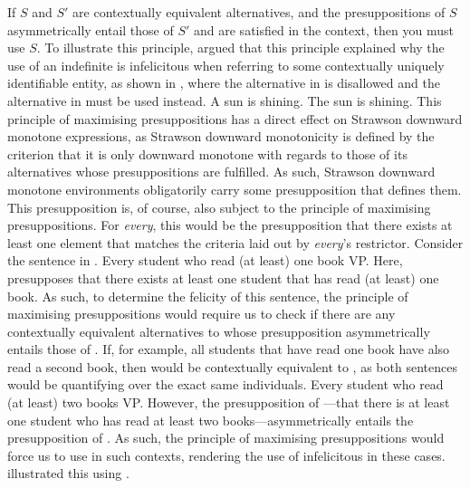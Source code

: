 If $S$ and $S'$ are contextually equivalent alternatives, and the presuppositions of $S$ asymmetrically entail those of $S'$ and are satisfied in the context, then you must use $S$.\hfill\parencite[p.~134]{Crnic2014-dogma}
\xe
To illustrate this principle, \textcite[p.~134]{Crnic2014-nm} argued that this principle explained why the use of an indefinite is infelicitous when referring to some contextually uniquely identifiable entity, as shown in , where the alternative in  is disallowed and the alternative in  must be used instead.
\pex\label{ex:maxpresup}
\a\ljudge{\#} A sun is shining.
\a The sun is shining.\hfill\parencite[p.~134]{Crnic2014-dogma}
\xe
This principle of maximising presuppositions has a direct effect on Strawson downward monotone expressions, as Strawson downward monotonicity is defined by the criterion that it is only downward monotone with regards to those of its alternatives whose presuppositions are fulfilled. As such, Strawson downward monotone environments obligatorily carry some presupposition that defines them. This presupposition is, of course, also subject to the principle of maximising presuppositions. For \textit{every}, this would be the presupposition that there exists at least one element that matches the criteria laid out by \textit{every}'s restrictor. Consider the sentence in .
\ex
Every student who read (at least) one book VP.
\xe
Here,  presupposes that there exists at least one student that has read (at least) one book. As such, to determine the felicity of this sentence, the principle of maximising presuppositions would require us to check if there are any contextually equivalent alternatives to  whose presupposition asymmetrically entails those of . If, for example, all students that have read one book have also read a second book, then  would be contextually equivalent to , as both sentences would be quantifying over the exact same individuals.
\ex
Every student who read (at least) two books VP.
\xe
However, the presupposition of ---that there is at least one student who has read at least two books---asymmetrically entails the presupposition of . As such, the principle of maximising presuppositions would force us to use  in such contexts, rendering the use of  infelicitous in these cases. \textcite{Crnic2014-dogma} illustrated this using .
